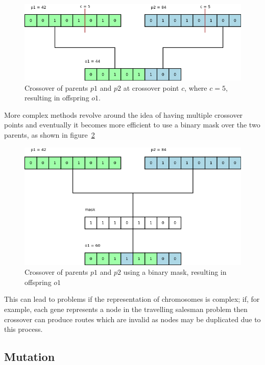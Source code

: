 \documentclass[10pt, a4paper]{article}
\begin{document}
\begin{figure}[h]
\centering
\includegraphics[scale=0.45]{img/crossover.png}
\caption{Crossover of parents $p1$ and $p2$ at crossover point $c$, where 
         $c=5$, resulting in offspring $o1$.} 
\label{fig:crossover-point}
\end{figure}

More complex methods revolve around the idea of having multiple crossover 
points and eventually it becomes more efficient to use a binary mask over
the two parents, as shown in figure~\ref{fig:crossover-mask}

\begin{figure}[h]
\includegraphics[scale=0.45]{img/mask-crossover.png}
\caption{Crossover of parents $p1$ and $p2$ using a binary mask, resulting in
         offspring $o1$}
\label{fig:crossover-mask}
\end{figure}

This can lead to problems if the representation of chromosomes is complex; if,
for example, each gene represents a node in the travelling salesman problem
then crossover can produce routes which are invalid as nodes may be duplicated
due to this process.

\subsection{Mutation}
\end{document}
